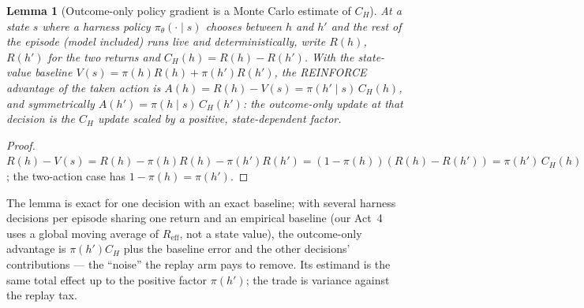 \documentclass{article}
\newtheorem{lemma}{Lemma}
\theoremstyle{remark}
\begin{document}
\begin{lemma}[Outcome-only policy gradient is a Monte Carlo estimate of $C_H$]
\label{lem:pg}
At a state $s$ where a harness policy $\pi_\theta(\cdot \mid s)$ chooses
between $h$ and $h'$ and the rest of the episode (model included) runs
live and deterministically, write $R(h)$, $R(h')$ for the two returns and
$C_H(h) = R(h) - R(h')$. With the state-value baseline $V(s) = \pi(h)R(h)
+ \pi(h')R(h')$, the REINFORCE advantage of the taken action is
$A(h) = R(h) - V(s) = \pi(h' \mid s)\, C_H(h)$, and symmetrically $A(h')
= \pi(h \mid s)\, C_H(h')$: the outcome-only update at that decision is
the $C_H$ update scaled by a positive, state-dependent factor.
\end{lemma}
\begin{proof}
$R(h) - V(s) = R(h) - \pi(h)R(h) - \pi(h')R(h') = (1 - \pi(h))(R(h) -
R(h')) = \pi(h')\,C_H(h)$; the two-action case has $1 - \pi(h) =
\pi(h')$.
\end{proof}
The lemma is exact for one decision with an exact baseline; with several
harness decisions per episode sharing one return and an empirical
baseline (our Act~4 uses a global moving average of $R_{\text{eff}}$,
not a state value), the outcome-only advantage is $\pi(h')C_H$ plus
the baseline error and the other decisions' contributions --- the
``noise'' the replay arm pays to remove. Its estimand is the same total
effect up to the positive factor $\pi(h')$; the trade is variance
against the replay tax.
\end{document}
